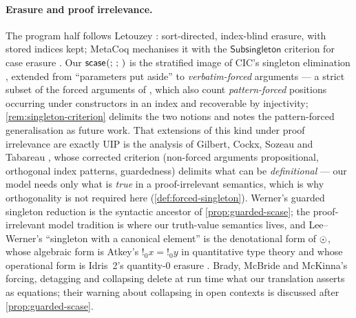 \paragraph{Erasure and proof irrelevance.}  The program half follows
Letouzey \cite{Letouzey2003,Letouzey2004,Letouzey2008}: sort-directed,
index-blind erasure, with stored indices kept; MetaCoq mechanises it
with the $\mathsf{Subsingleton}$ criterion for case erasure
\cite{SozeauEtAl2020}.  Our $\mathsf{scase}_{}(;\,;\,)$ is the stratified image of
CIC's singleton elimination \cite{Rocq}, extended from ``parameters put
aside'' to \emph{verbatim-forced} arguments --- a strict subset of the
forced arguments of \cite{BradyEtAl2004,GilbertEtAl2019}, which also
count \emph{pattern-forced} positions occurring under constructors in
an index and recoverable by injectivity;
\cref{rem:singleton-criterion} delimits the two notions and notes the
pattern-forced generalisation as future work.  That extensions of this
kind under proof irrelevance are exactly UIP is the analysis of
Gilbert, Cockx, Sozeau and Tabareau
\cite{GilbertEtAl2019}, whose corrected criterion (non-forced arguments
propositional, orthogonal index patterns, guardedness) delimits what can
be \emph{definitional} --- our model needs only what is \emph{true} in a
proof-irrelevant semantics, which is why orthogonality is not required
here (\cref{def:forced-singleton}).  Werner's guarded singleton
reduction \cite{Werner2008} is the syntactic ancestor of
\cref{prop:guarded-scase}; the proof-irrelevant model tradition
\cite{Werner1997,MiquelWerner2003,LeeWerner2011} is where our
truth-value semantics lives, and Lee--Werner's ``singleton with a
canonical element'' is the denotational form of $\odot$, whose
algebraic form is Atkey's $!_0x = {!}_0y$ in quantitative type theory
\cite{Atkey2018} and whose operational form is Idris~2's
quantity-$0$ erasure \cite{Brady2021}.  Brady, McBride and McKinna's
forcing, detagging and collapsing \cite{BradyEtAl2004} delete at run
time what our translation asserts as equations; their warning about
collapsing in open contexts is discussed after
\cref{prop:guarded-scase}.


